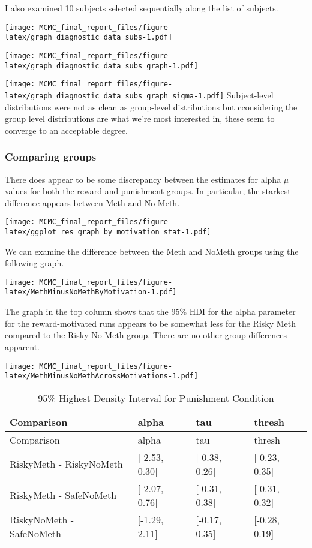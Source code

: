 \documentclass[]{article}
\begin{document}
I also examined 10 subjects selected sequentially along the list of
subjects.

\texttt{[image: MCMC\_final\_report\_files/figure-latex/graph\_diagnostic\_data\_subs-1.pdf]}

\texttt{[image: MCMC\_final\_report\_files/figure-latex/graph\_diagnostic\_data\_subs\_graph-1.pdf]}

\texttt{[image: MCMC\_final\_report\_files/figure-latex/graph\_diagnostic\_data\_subs\_graph\_sigma-1.pdf]}
Subject-level distributions were not as clean as group-level
distributions but cconsidering the group level distributions are what
we're most interested in, these seem to converge to an acceptable
degree.

\subsubsection{Comparing groups}\label{comparing-groups}

There does appear to be some discrepancy between the estimates for alpha
\(\mu\) values for both the reward and punishment groups. In particular,
the starkest difference appears between Meth and No Meth.

\texttt{[image: MCMC\_final\_report\_files/figure-latex/ggplot\_res\_graph\_by\_motivation\_stat-1.pdf]}

We can examine the difference between the Meth and NoMeth groups using
the following graph.

\texttt{[image: MCMC\_final\_report\_files/figure-latex/MethMinusNoMethByMotivation-1.pdf]}

The graph in the top column shows that the 95\% HDI for the alpha
parameter for the reward-motivated runs appears to be somewhat less for
the Risky Meth compared to the Risky No Meth group. There are no other
group differences apparent.

\texttt{[image: MCMC\_final\_report\_files/figure-latex/MethMinusNoMethAcrossMotivations-1.pdf]}

\begin{longtable}[]{@{}llll@{}}
\caption{95\% Highest Density Interval for Punishment
Condition}\tabularnewline
\toprule
Comparison & alpha & tau & thresh\tabularnewline
\midrule
\endfirsthead
\toprule
Comparison & alpha & tau & thresh\tabularnewline
\midrule
\endhead
RiskyMeth - RiskyNoMeth & {[}-2.53, 0.30{]} & {[}-0.38, 0.26{]} &
{[}-0.23, 0.35{]}\tabularnewline
RiskyMeth - SafeNoMeth & {[}-2.07, 0.76{]} & {[}-0.31, 0.38{]} &
{[}-0.31, 0.32{]}\tabularnewline
RiskyNoMeth - SafeNoMeth & {[}-1.29, 2.11{]} & {[}-0.17, 0.35{]} &
{[}-0.28, 0.19{]}\tabularnewline
\bottomrule
\end{longtable}
\end{document}
